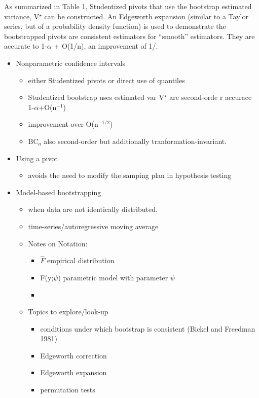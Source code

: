 \documentclass[bigger]{beamer}
\begin{document}
As summarized in Table 1, Studentized pivots that use the bootstrap
estimated variance, V$^{\star}$ can be constructed. An Edgeworth
expansion (similar to a Taylor series, but of a probability density
function) is used to demonstrate the bootstrapped pivots are
consistent estimators for ``smooth'' estimators. They are accurate to 1-$\alpha$ + O(1/n), an
improvement of 1/.

\begin{itemize}
\item Nonparametric confidence intervals
\begin{itemize}
\item either Studentized pivots or direct use of quantiles
\item Studentized bootstrap uses estimated var V$^{\star}$ are second-orde
   r accurace 1-$\alpha$+O(n$^{\mathrm{-1}}$)
\item improvement over O(n$^{\mathrm{-1/2}}$)
\item BC$_a$ also second-order but additionally tranformation-invariant.
\end{itemize}
\item Using a pivot
\begin{itemize}
\item avoids the need to modify the samping plan in hypothesis testing
\end{itemize}
\item Model-based bootstrapping
\begin{itemize}
\item when data are not identically distributed.
\item time-series/autoregressive moving average
\item Notes on Notation:
\begin{itemize}
\item $\hat{F}$ empirical distribution
\item F(y;$\psi$) parametric model with parameter $\psi$
\item 
\end{itemize}
\item Topics to explore/look-up
\begin{itemize}
\item conditions under which bootstrap is consistent (Bickel and
    Freedman 1981)
\item Edgeworth correction
\item Edgeworth expansion
\item permutation tests
\end{itemize}
\end{itemize}
\end{itemize}
\end{document}
